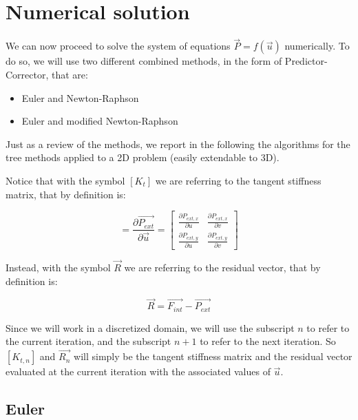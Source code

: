 \section{Numerical solution}
\label{sec:numerical_solution}

We can now proceed to solve the system of equations ${\vec{P}} = f({\vec{u}})$ numerically.
To do so, we will use two different combined methods, in the form of Predictor-Corrector, that are:

\begin{itemize}
    \item Euler and Newton-Raphson
    \item Euler and modified Newton-Raphson
\end{itemize}

Just as a review of the methods, we report in the following the algorithms for the tree methods applied to a 2D problem (easily extendable to 3D).

Notice that with the symbol $[K_t]$ we are referring to the tangent stiffness matrix, that by definition is:

\begin{equation}
    [K_t] = \frac{\partial \vec{P_{ext}}}{\partial \vec{u}}
    =
    \begin{bmatrix}
        \frac{\partial P_{ext,x}}{\partial u} & \frac{\partial P_{ext,x}}{\partial v} \\
        \frac{\partial P_{ext,y}}{\partial u} & \frac{\partial P_{ext,y}}{\partial v}
    \end{bmatrix}
    \label{eq:tangent_stiffness_matrix}
\end{equation}

Instead, with the symbol $\vec{R}$ we are referring to the residual vector, that by definition is:

\begin{equation}
    \vec{R} = \vec{F_{int}} - \vec{P_{ext}}
    \label{eq:residual_vector}
\end{equation}

Since we will work in a discretized domain, we will use the subscript $n$ to refer to the current iteration, and the subscript $n+1$ to refer to the next iteration.
So $[K_{t,n}]$ and $\vec{R_n}$ will simply be the tangent stiffness matrix and the residual vector evaluated at the current iteration with the associated values of $\vec{u}$.

\subsection{Euler}

